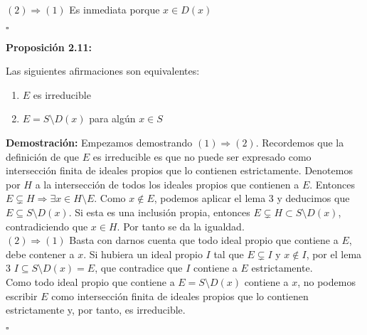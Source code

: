 \documentclass[11pt,spanish]{book}
\newcommand{\qed}{\begin{flushright} $\square$ \end{flushright}}
\begin{document}
$(2)\Rightarrow (1)$ Es inmediata porque $x\in D(x)$
\qed
\hypertarget{prop7}{\textbf{Proposición 2.11: }} Las siguientes afirmaciones son equivalentes:
\begin{enumerate}
    \item $E$ es irreducible
    \item $E = S\setminus D(x)$ para algún $x\in S$
\end{enumerate}
\textbf{Demostración: }
Empezamos demostrando $(1)\Rightarrow (2)$. Recordemos que la definición de que $E$ es irreducible es que no puede ser expresado como intersección finita de ideales propios que lo contienen estrictamente. Denotemos por $H$ a la intersección de todos los ideales propios que contienen a $E$. Entonces $E\subsetneq H\Rightarrow \exists x\in H\setminus E$. Como $x\notin E$, podemos aplicar el lema 3 y deducimos que $E\subseteq S\setminus D(x)$. Si esta es una inclusión propia, entonces $E\subsetneq H\subset S\setminus D(x)$, contradiciendo que $x\in H$. Por tanto se da la igualdad.\\

$(2)\Rightarrow (1)$
Basta con darnos cuenta que todo ideal propio que contiene a $E$, debe contener a $x$. Si hubiera un ideal propio $I$ tal que $E\subsetneq I$ y $x\notin I$, por el lema 3 $I\subseteq S\setminus D(x) = E$, que contradice que $I$ contiene a $E$ estrictamente.\\

Como todo ideal propio que contiene a $E = S\setminus D(x)$ contiene a $x$, no podemos escribir $E$ como intersección finita de ideales propios que lo contienen estrictamente y, por tanto, es irreducible. 
\qed
\end{document}
